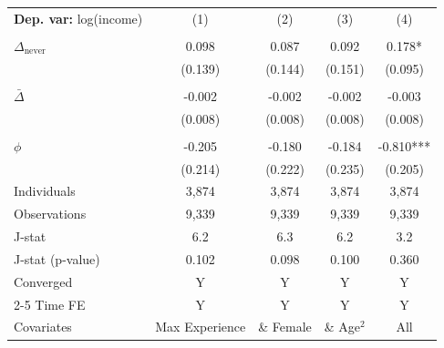 \begin{tabular}{l cccc} \toprule  \textbf{Dep. var:}  log(income) 
                    &\multicolumn{1}{c}{(1)}   &\multicolumn{1}{c}{(2)}   &\multicolumn{1}{c}{(3)}   &\multicolumn{1}{c}{(4)}   \\
                    &               &               &               &               \\
\addlinespace
$\Delta_{\text{never}}$&       0.098   &       0.087   &       0.092   &       0.178*  \\
                    &     (0.139)   &     (0.144)   &     (0.151)   &     (0.095)   \\
                    &               &               &               &               \\
\addlinespace
$\bar{\Delta}$      &      -0.002   &      -0.002   &      -0.002   &      -0.003   \\
                    &     (0.008)   &     (0.008)   &     (0.008)   &     (0.008)   \\
                    &               &               &               &               \\
\addlinespace
$\phi$              &      -0.205   &      -0.180   &      -0.184   &      -0.810***\\
                    &     (0.214)   &     (0.222)   &     (0.235)   &     (0.205)   \\
\addlinespace
Individuals         &       3,874   &       3,874   &       3,874   &       3,874   \\
Observations        &       9,339   &       9,339   &       9,339   &       9,339   \\
J-stat              &         6.2   &         6.3   &         6.2   &         3.2   \\
J-stat (p-value)    &       0.102   &       0.098   &       0.100   &       0.360   \\
Converged           &           Y   &           Y   &           Y   &           Y   \\
\cmidrule{2-5} Time FE & Y & Y & Y & Y \\ Covariates & Max Experience & \& Female & \& Age$^2$ & All \\ \bottomrule \end{tabular}
